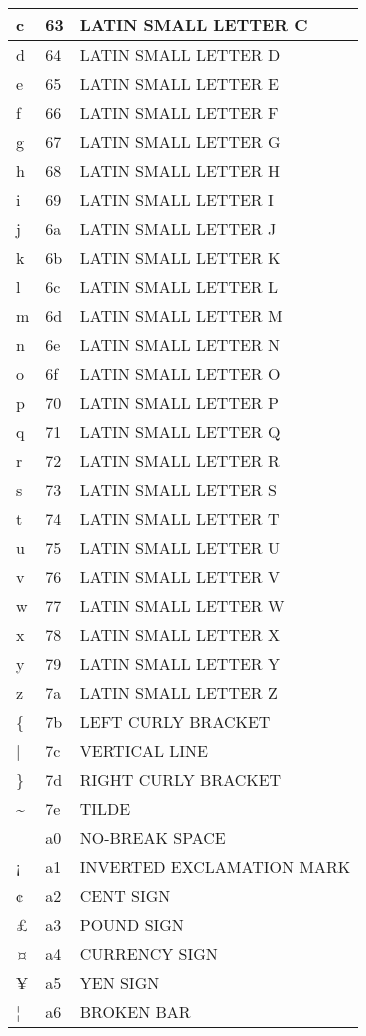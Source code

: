 \documentclass[12pt,letterpaper,openany]{book}
\begin{document}
\begin{center}
\begin{supertabular}{|m{0.25in}|m{0.5in}|m{4in}|}
c & 63 & LATIN SMALL LETTER C\\\hline
d & 64 & LATIN SMALL LETTER D\\\hline
e & 65 & LATIN SMALL LETTER E\\\hline
f & 66 & LATIN SMALL LETTER F\\\hline
g & 67 & LATIN SMALL LETTER G\\\hline
h & 68 & LATIN SMALL LETTER H\\\hline
i & 69 & LATIN SMALL LETTER I\\\hline
j & 6a & LATIN SMALL LETTER J\\\hline
k & 6b & LATIN SMALL LETTER K\\\hline
l & 6c & LATIN SMALL LETTER L\\\hline
m & 6d & LATIN SMALL LETTER M\\\hline
n & 6e & LATIN SMALL LETTER N\\\hline
o & 6f & LATIN SMALL LETTER O\\\hline
p & 70 & LATIN SMALL LETTER P\\\hline
q & 71 & LATIN SMALL LETTER Q\\\hline
r & 72 & LATIN SMALL LETTER R\\\hline
s & 73 & LATIN SMALL LETTER S\\\hline
t & 74 & LATIN SMALL LETTER T\\\hline
u & 75 & LATIN SMALL LETTER U\\\hline
v & 76 & LATIN SMALL LETTER V\\\hline
w & 77 & LATIN SMALL LETTER W\\\hline
x & 78 & LATIN SMALL LETTER X\\\hline
y & 79 & LATIN SMALL LETTER Y\\\hline
z & 7a & LATIN SMALL LETTER Z\\\hline
\{ & 7b & LEFT CURLY BRACKET\\\hline
| & 7c & VERTICAL LINE\\\hline
\} & 7d & RIGHT CURLY BRACKET\\\hline
\~{} & 7e & TILDE\\\hline
\  & a0 & NO-BREAK SPACE\\\hline
¡ & a1 & INVERTED EXCLAMATION MARK\\\hline
¢ & a2 & CENT SIGN\\\hline
£ & a3 & POUND SIGN\\\hline
¤ & a4 & CURRENCY SIGN\\\hline
¥ & a5 & YEN SIGN\\\hline
¦ & a6 & BROKEN BAR\\\hline

\end{supertabular}
\end{center}
\end{document}
